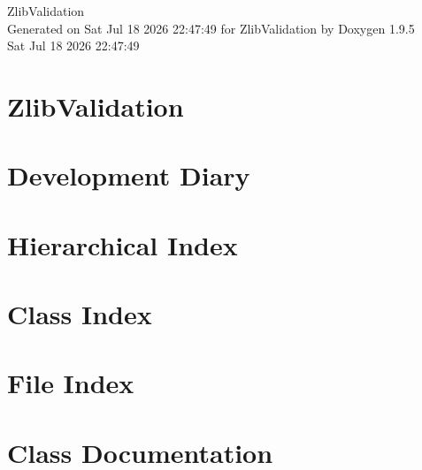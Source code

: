 \documentclass[twoside]{book}
\newcommand{\+}{\discretionary{\mbox{\scriptsize$\hookleftarrow$}}{}{}}
\newcommand{\clearemptydoublepage}{%
    \newpage{\pagestyle{empty}\cleardoublepage}%
  }
\begin{document}
  \raggedbottom
    \hypersetup{pageanchor=false,
                bookmarksnumbered=true,
                pdfencoding=unicode
               }
  \begin{titlepage}
  \vspace*{7cm}
  \begin{center}%
  {\Large Zlib\+Validation}\\
  \vspace*{1cm}
  {\large Generated on Sat Jul 18 2026 22\+:47\+:49 for Zlib\+Validation by Doxygen 1.9.5}\\
    \vspace*{0.5cm}
    {\small Sat Jul 18 2026 22:47:49}
  \end{center}
  \end{titlepage}
  \clearemptydoublepage
  \tableofcontents
  \clearemptydoublepage
  \hypersetup{pageanchor=true}
\chapter{Zlib\+Validation}
\label{md_README}

\chapter{Development Diary}
\label{md_doc_ChangeLog}

\chapter{Hierarchical Index}

\chapter{Class Index}

\chapter{File Index}

\chapter{Class Documentation}
















\end{document}
